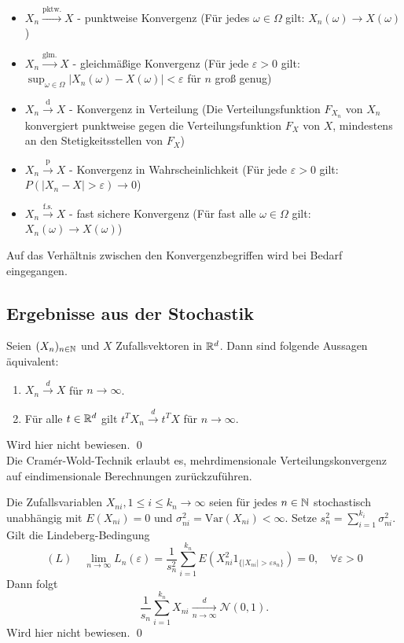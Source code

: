 \begin{itemize}
    \item $X_n \xrightarrow{\mathrm{pktw.}} X$ - punktweise Konvergenz (Für jedes $\omega \in \Omega$ gilt: $X_n(\omega) \to X(\omega)$)
    \item $X_n \xrightarrow{\mathrm{glm.}} X$ - gleichmäßige Konvergenz (Für jede $\varepsilon > 0$ gilt: $\sup_{\omega \in \Omega} |X_n(\omega) - X(\omega)| < \varepsilon$ für $n$ groß genug)
    \item $X_n \xrightarrow{\mathrm{d}} X$ - Konvergenz in Verteilung (Die Verteilungsfunktion $F_{X_n}$ von $X_n$ konvergiert punktweise gegen die Verteilungsfunktion $F_X$ von $X$, mindestens an den Stetigkeitsstellen von $F_X$)
    \item $X_n \xrightarrow{\mathrm{p}} X$ - Konvergenz in Wahrscheinlichkeit (Für jede $\varepsilon > 0$ gilt: $P(|X_n - X| > \varepsilon) \to 0$)
    \item $X_n \xrightarrow{\mathrm{f.s.}} X$ - fast sichere Konvergenz (Für fast alle $\omega \in \Omega$ gilt: $X_n(\omega) \to X(\omega)$)
\end{itemize}

Auf das Verhältnis zwischen den Konvergenzbegriffen wird bei Bedarf eingegangen.

\subsection{Ergebnisse aus der Stochastik}

\begin{satz}\label{satz:cramer_wold}
Seien $(X_n)_{n \in \Bbb N}$ und $X$ Zufallsvektoren in $\Bbb R^d$. Dann sind folgende Aussagen äquivalent:
\begin{enumerate}
    \item $X_n \xrightarrow{d} X$ für $n \to \infty$.
    \item Für alle $t \in \Bbb R^d$ gilt $t^T X_n \xrightarrow{d} t^T X$ für $n \to \infty$.
\end{enumerate}
Wird hier nicht bewiesen. \qed \\
Die Cramér-Wold-Technik erlaubt es, mehrdimensionale Verteilungskonvergenz auf eindimensionale Berechnungen zurückzuführen.
\end{satz}

\begin{satz}\label{satz:lindeberg_feller}
Die Zufallsvariablen $X_{ni}, 1 \le i \le k_n \to \infty$ seien für jedes $n \in \Bbb N$ stochastisch unabhängig mit
$E(X_{ni})=0$ und $\sigma^2_{ni} = \text{Var}(X_{ni}) \lt \infty$.
Setze $s_n^2 = \sum_{i=1}^{k_i} \sigma_{ni}^2$. Gilt die Lindeberg-Bedingung
$$(L) \quad \lim_{n \to \infty} L_n(\varepsilon) = \frac{1}{s_n^2} \sum_{i=1}^{k_n} E(X^2_{ni} 1_{\{\vert X_{ni} \vert \gt \varepsilon s_n\}})=0, \quad \forall \varepsilon \gt 0$$
Dann folgt
$$\frac{1}{s_n} \sum_{i=1}^{k_n} X_{ni} \underset{n \to \infty}{\overset d \longrightarrow} \mathcal N(0,1).$$
Wird hier nicht bewiesen. \qed
\end{satz}

